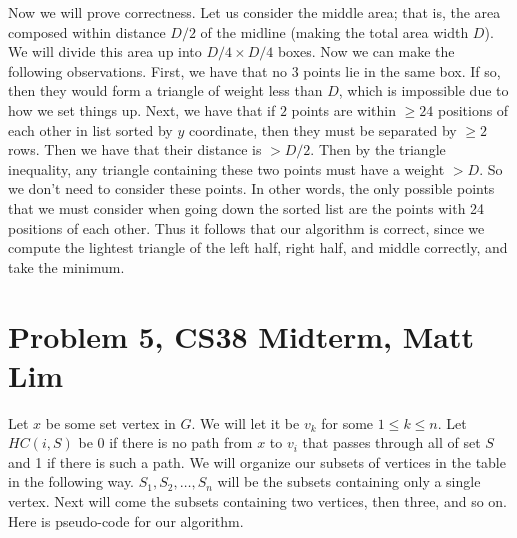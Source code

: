 \documentclass{article}
\begin{document}
\vspace{8mm}
Now we will prove correctness. Let us consider the middle area; that is, the
area composed within distance $D/2$ of the midline (making the total area width
$D$). We will divide this area up into $D/4 \times D/4$ boxes. Now we can make
the following observations. First, we have that no $3$ points lie in the same
box. If so, then they would form a triangle of weight less than $D$, which is
impossible due to how we set things up. Next, we have that if $2$ points are
within $\ge 24$ positions of each other in list sorted by $y$ coordinate, then
they must be separated by $\ge 2$ rows. Then we have that their distance is $>
D/2$. Then by the triangle inequality, any triangle containing these two points
must have a weight $>D$. So we don't need to consider these points. In other
words, the only possible points that we must consider when going down the sorted
list are the points with 24 positions of each other. Thus it follows that our
algorithm is correct, since we compute the lightest triangle of the left half,
right half, and middle correctly, and take the minimum.
\newpage

\section*{Problem 5, CS38 Midterm, Matt Lim}
Let $x$ be some set vertex in $G$. We will let it be $v_k$ for some $1 \le k \le n$.
Let $HC(i,S)$ be 0 if there
is no path from $x$ to $v_i$ that passes through all of set $S$
and 1 if there is such a path. We
will organize our subsets of vertices in the table in the following way. $S_1,
S_2, \dots, S_n$ will be the subsets containing only a single vertex. Next will
come the subsets containing two vertices, then three, and so on.
Here is pseudo-code for our algorithm.
\end{document}
